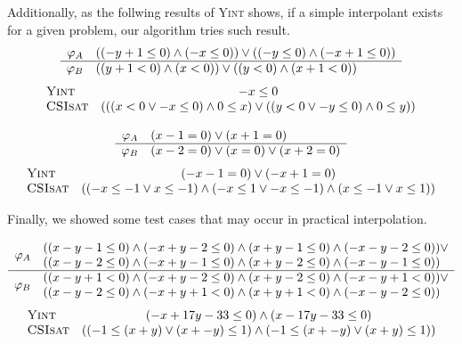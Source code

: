 Additionally, as the follwing results of \textsc{Yint} shows, if a
simple interpolant exists for a given problem, our algorithm tries
such result.
\[\begin{array}{r l}
\varphi_A & ((-y+1 \leq 0) \wedge (-x \leq 0)) \vee ((-y \leq 0) \wedge (-x+1 \leq 0)) \\
\hline
\varphi_B & ((y+1<0) \wedge (x<0)) \vee ((y<0) \wedge (x+1<0))
\end{array}\]
\[\begin{array}{l c}
\text{\textsc{Yint}} & -x \leq 0 \\
\text{\textsc{CSIsat}} & (((x < 0 \vee -x \leq 0) \wedge 0 \leq x) \vee ((y < 0 \vee -y \leq 0) \wedge 0 \leq y))
\end{array}\]

\bigskip\centerline{}

\[\begin{array}{r l}
\varphi_A & (x-1=0) \vee (x+1=0) \\
\hline
\varphi_B & (x-2=0) \vee (x=0) \vee (x+2=0)
\end{array}\]
\[\begin{array}{l c}
\text{\textsc{Yint}} & (-x-1=0) \vee (-x+1=0) \\
\text{\textsc{CSIsat}} & ((-x \leq -1 \vee x \leq -1) \wedge (-x \leq 1 \vee - x \leq - 1) \wedge (x \leq - 1 \vee x \leq 1))
\end{array}\]

Finally, we showed some test cases that may occur in practical interpolation.

\[\begin{array}{r l}
\multirow{2}{*}{$\varphi_A$}
& ((x-y-1 \leq 0) \wedge (-x+y-2 \leq 0) \wedge (x+y-1 \leq 0) \wedge (-x-y-2 \leq 0)) \vee \\
& ((x-y-2 \leq 0) \wedge (-x+y-1 \leq 0) \wedge (x+y-2 \leq 0) \wedge (-x-y-1 \leq 0)) \\
\hline
\multirow{2}{*}{$\varphi_B$}
& ((x-y+1<0) \wedge (-x+y-2 \leq 0) \wedge (x+y-2 \leq 0) \wedge (-x-y+1<0)) \vee \\
& ((x-y-2 \leq 0) \wedge (-x+y+1<0) \wedge (x+y+1<0) \wedge (-x-y-2 \leq 0))
\end{array}\]
\[\begin{array}{l c}
\text{\textsc{Yint}} & (-x+17y-33 \leq 0) \wedge (x-17y-33 \leq 0) \\
\text{\textsc{CSIsat}} & ((-1 \leq (x + y) \vee (x + -y) \leq 1) \wedge (-1 \leq (x + -y) \vee (x + y) \leq 1))
\end{array}\]

